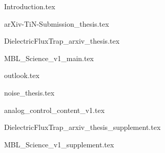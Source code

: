 





\begin{frontmatter}










\cleardoublepage
{}
\begin{singlespace}
\tableofcontents
\end{singlespace}

\end{frontmatter}

\pagestyle{plain} %

%
{Introduction.tex}

{arXiv-TiN-Submission_thesis.tex}

{DielectricFluxTrap_arxiv_thesis.tex}

{MBL_Science_v1_main.tex}

{outlook.tex}

\begin{appendices}

{noise_thesis.tex}

{analog_control_content_v1.tex}

{DielectricFluxTrap_arxiv_thesis_supplement.tex}

{MBL_Science_v1_supplement.tex}

\end{appendices}




%
%
\printbibliography


